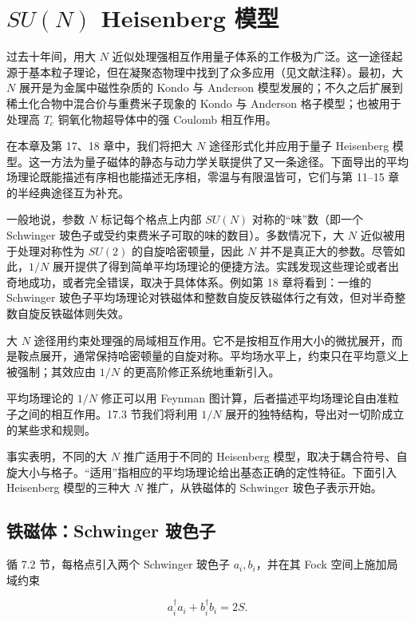 \chapter{$SU(N)$ Heisenberg 模型}

过去十年间，用大 $N$ 近似处理强相互作用量子体系的工作极为广泛。这一途径起源于基本粒子理论，但在凝聚态物理中找到了众多应用（见文献注释）。最初，大 $N$ 展开是为金属中磁性杂质的 Kondo 与 Anderson 模型发展的；不久之后扩展到稀土化合物中混合价与重费米子现象的 Kondo 与 Anderson 格子模型；也被用于处理高 $T_{c}$ 铜氧化物超导体中的强 Coulomb 相互作用。

在本章及第 17、18 章中，我们将把大 $N$ 途径形式化并应用于量子 Heisenberg 模型。这一方法为量子磁体的静态与动力学关联提供了又一条途径。下面导出的平均场理论既能描述有序相也能描述无序相，零温与有限温皆可，它们与第 11--15 章的半经典途径互为补充。

一般地说，参数 $N$ 标记每个格点上内部 $SU(N)$ 对称的“味”数（即一个 Schwinger 玻色子或受约束费米子可取的味的数目）。多数情况下，大 $N$ 近似被用于处理对称性为 $SU(2)$ 的自旋哈密顿量，因此 $N$ 并不是真正大的参数。尽管如此，$1/N$ 展开提供了得到简单平均场理论的便捷方法。实践发现这些理论或者出奇地成功，或者完全错误，取决于具体体系。例如第 18 章将看到：一维的 Schwinger 玻色子平均场理论对铁磁体和整数自旋反铁磁体行之有效，但对半奇整数自旋反铁磁体则失效。

大 $N$ 途径用约束处理强的局域相互作用。它不是按相互作用大小的微扰展开，而是鞍点展开，通常保持哈密顿量的自旋对称。平均场水平上，约束只在平均意义上被强制；其效应由 $1/N$ 的更高阶修正系统地重新引入。

平均场理论的 $1/N$ 修正可以用 Feynman 图计算，后者描述平均场理论自由准粒子之间的相互作用。17.3 节我们将利用 $1/N$ 展开的独特结构，导出对一切阶成立的某些求和规则。

事实表明，不同的大 $N$ 推广适用于不同的 Heisenberg 模型，取决于耦合符号、自旋大小与格子。“适用”指相应的平均场理论给出基态正确的定性特征。下面引入 Heisenberg 模型的三种大 $N$ 推广，从铁磁体的 Schwinger 玻色子表示开始。

\section{铁磁体：Schwinger 玻色子}

循 7.2 节，每格点引入两个 Schwinger 玻色子 $a_{i}, b_{i}$，并在其 Fock 空间上施加局域约束

\begin{equation*}
a _ {i} ^ {\dagger} a _ {i} + b _ {i} ^ {\dagger} b _ {i} = 2 S.
\tag{16.1}
\end{equation*}

